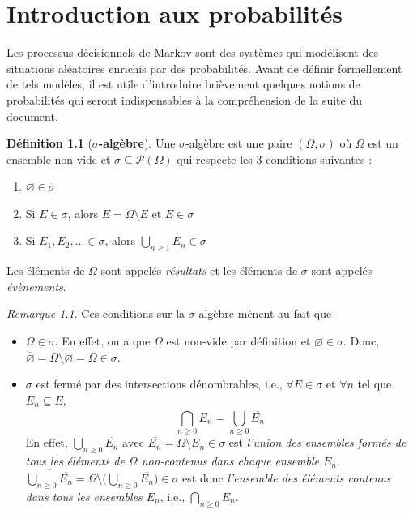 \documentclass[12pt,a4paper]{report}
\theoremstyle{definition}%
\newtheorem{definition}{Définition}[chapter]
\theoremstyle{remark}
\newtheorem{remark}{Remarque}[chapter]
\newcommand{\ie}{i.e., }
\let\labelitemi\labelitemii
\begin{document}
\chapter{Introduction aux probabilités}
Les processus décisionnels de Markov sont des systèmes qui modélisent des situations aléatoires enrichis par des probabilités. Avant de définir formellement de tels modèles, il est utile d'introduire brièvement quelques notions de probabilités qui seront indispensables à la compréhension de la suite du document.

\begin{definition}[\textbf{$\sigma$-algèbre}]
	Une $\sigma$-algèbre est une paire $(\Omega, \sigma)$ où $\Omega$ est un ensemble non-vide et $\sigma \subseteq \mathcal{P}(\Omega)$ qui respecte les $3$ conditions suivantes :
	\begin{enumerate}
		\item $\varnothing \in \sigma$
		\item Si $E \in \sigma$, alors $\overline{E} = \Omega \setminus E$ et $\overline{E} \in \sigma$
		\item Si $E_1, E_2, \dots \in \sigma$, alors $\bigcup_{n \geq 1} E_n \in \sigma$
	\end{enumerate}
	Les éléments de $\Omega$ sont appelés \textit{résultats} et les éléments de $\sigma$ sont appelés \textit{évènements}.
\end{definition}

\begin{remark} \label{probaremark}
	Ces conditions sur la $\sigma$-algèbre mènent au fait que
	\begin{itemize}
		\renewcommand{\labelitemi}{\tiny$\bullet$}
		\item
	$\Omega \in \sigma$. En effet, on a que $\Omega$ est non-vide par définition et $\varnothing \in \sigma$. Donc, $\overline{\varnothing} = \Omega \setminus \varnothing = \Omega \in \sigma$.
		\item 	$\sigma$ est fermé par des intersections dénombrables, \ie $\forall E \in \sigma$ et $\forall n$ tel que $E_n \subseteq E$,
		\[ \bigcap_{n \geq 0} E_n = \overline{\bigcup_{n \geq 0} \overline{E_n}}\]
		En effet, $\bigcup_{n \geq 0} \overline{E_n} \text{ avec } \overline{E_n}  = \Omega \setminus E_n \in \sigma$ est \textit{l'union des ensembles formés de tous les éléments de $\Omega$ non-contenus dans chaque ensemble $E_n$}. \\
		$\overline{\bigcup_{n \geq 0} \overline{E_n}} = \Omega \setminus \big(\bigcup_{n \geq 0} \overline{E_n} \big) \in \sigma$ est donc \textit{l'ensemble des éléments contenus dans tous les ensembles $E_n$}, \ie $\bigcap_{n \geq 0} E_n$.
	\end{itemize}
\end{remark}
\end{document}

